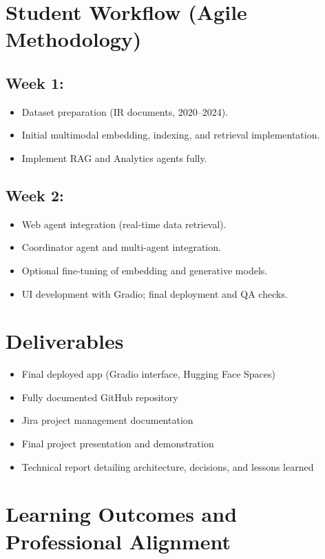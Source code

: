\documentclass[12pt]{article}
\begin{document}
\section*{Student Workflow (Agile Methodology)}

\subsection*{Week 1:}
\begin{itemize}[noitemsep]
    \item Dataset preparation (IR documents, 2020–2024).
    \item Initial multimodal embedding, indexing, and retrieval implementation.
    \item Implement RAG and Analytics agents fully.
\end{itemize}

\subsection*{Week 2:}
\begin{itemize}[noitemsep]
    \item Web agent integration (real-time data retrieval).
    \item Coordinator agent and multi-agent integration.
    \item Optional fine-tuning of embedding and generative models.
    \item UI development with Gradio; final deployment and QA checks.
\end{itemize}

\section*{Deliverables}
\begin{itemize}[noitemsep]
    \item Final deployed app (Gradio interface, Hugging Face Spaces)
    \item Fully documented GitHub repository
    \item Jira project management documentation
    \item Final project presentation and demonstration
    \item Technical report detailing architecture, decisions, and lessons learned
\end{itemize}

\section*{Learning Outcomes and Professional Alignment}
\end{document}
